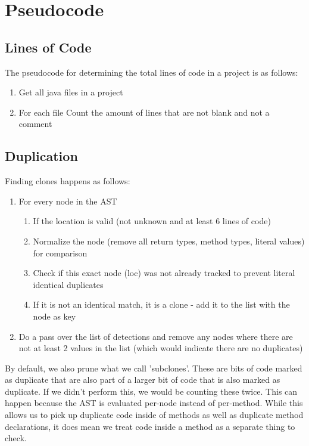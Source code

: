 \documentclass{article}
\begin{document}
\section{Pseudocode}

\subsection{Lines of Code}\label{pseudo:loc}
The pseudocode for determining the total lines of code in a project is as follows:
\begin{enumerate}
\item Get all java files in a project
\item For each file
\subitem Count the amount of lines that are not blank and not a comment
\end{enumerate}

\subsection{Duplication}\label{pseudo:dupe}
Finding clones happens as follows:

\begin{enumerate}
\item For every node in the AST
\begin{enumerate}
\item If the location is valid (not unknown and at least 6 lines of code)
\item Normalize the node (remove all return types, method types, literal values) for comparison
\item Check if this exact node (loc) was not already tracked to prevent literal identical duplicates
\item If it is not an identical match, it is a clone - add it to the list with the node as key
\end{enumerate}
\item Do a pass over the list of detections and remove any nodes where there are not at least 2 values in the list (which would indicate there are no duplicates)
\end{enumerate}

By default, we also prune what we call 'subclones'. These are bits of code marked as duplicate that are also part of a larger bit of code that is also marked as duplicate. If we didn't perform this, we would be counting these twice. This can happen because the AST is evaluated per-node instead of per-method. While this allows us to pick up duplicate code inside of methods as well as duplicate method declarations, it does mean we treat code inside a method as a separate thing to check.
\end{document}
